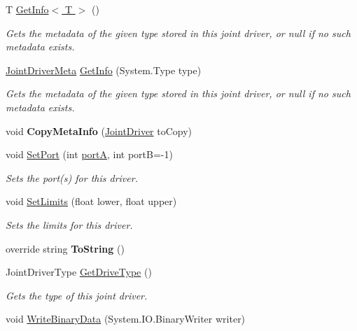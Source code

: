 \begin{DoxyCompactItemize}
T \hyperlink{class_joint_driver_af4a1c0ffdb06dcd0dea4b2a7524fb1c8}{Get\+Info$<$ T $>$} ()
\begin{DoxyCompactList}\small\item\em Gets the metadata of the given type stored in this joint driver, or null if no such metadata exists. \end{DoxyCompactList}\item 
\hyperlink{class_joint_driver_meta}{Joint\+Driver\+Meta} \hyperlink{class_joint_driver_ab791d90626a1821f03329d65ccbe3e74}{Get\+Info} (System.\+Type type)
\begin{DoxyCompactList}\small\item\em Gets the metadata of the given type stored in this joint driver, or null if no such metadata exists. \end{DoxyCompactList}\item 
\mbox{\label{class_joint_driver_aa266e2618a7a89e242ff22dae9590666}} 
void {\bfseries Copy\+Meta\+Info} (\hyperlink{class_joint_driver}{Joint\+Driver} to\+Copy)
\item 
void \hyperlink{class_joint_driver_ae1758d47d4b9142ce00e0b1b4da8a26d}{Set\+Port} (int \hyperlink{class_joint_driver_a8bd27164aad80347972763dd56c5b311}{portA}, int portB=-\/1)
\begin{DoxyCompactList}\small\item\em Sets the port(s) for this driver. \end{DoxyCompactList}\item 
void \hyperlink{class_joint_driver_a1427fe9a653b2977ed487f140c3af32b}{Set\+Limits} (float lower, float upper)
\begin{DoxyCompactList}\small\item\em Sets the limits for this driver. \end{DoxyCompactList}\item 
\mbox{\label{class_joint_driver_ae76d84f55920b4238b1f96038abaf5ce}} 
override string {\bfseries To\+String} ()
\item 
Joint\+Driver\+Type \hyperlink{class_joint_driver_ab63c7e975d5b4317b7c47ffb34596b78}{Get\+Drive\+Type} ()
\begin{DoxyCompactList}\small\item\em Gets the type of this joint driver. \end{DoxyCompactList}\item 
void \hyperlink{class_joint_driver_a36d6deba7dec0475dc06ab5d87c3e7e2}{Write\+Binary\+Data} (System.\+I\+O.\+Binary\+Writer writer)

\end{DoxyCompactItemize}
